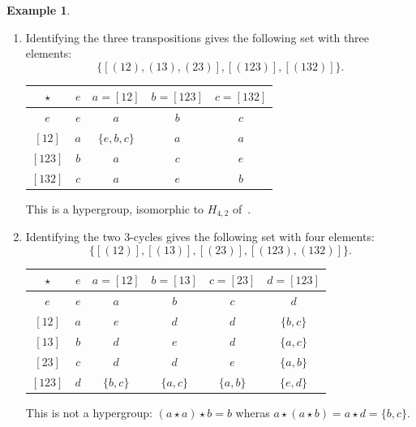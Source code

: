 \documentclass[reqno]{amsart}
\numberwithin{equation}{section}
\theoremstyle{plain}
\theoremstyle{definition}
\newtheorem{example}[equation]{Example}
\begin{document}
\begin{example}
\begin{enumerate}
\item Identifying the three transpositions gives the following set with three elements:
$$\{[(12), (13), (23)], [(123)], [(132)]\}.$$  
\begin{center}
\begin{tabular}{ |c|c|c|c|c| } 
\hline
$\star$ & $e$ & $a=[12]$ & $b=[123]$ & $c=[132]$ \\
\hline
$e$ & $e$ & $a$ & $b$ & $c$ \\ 
\hline
$[12]$ & $a$ & $\{e, b, c\}$ & $a$
& $a$\\ 
\hline
$[123]$ & $b$ & $a$ & $c$
& $e$\\ 
\hline
$[132]$ & $c$ & $a$ & $e$
& $b$\\ 
\hline
\end{tabular}
\end{center}   
This is a hypergroup, isomorphic to $H_{4, 2}$ of~\cite[\S 7.2]{Zieschang}.

\item Identifying the two 3-cycles gives the following set with four elements:
$$\{[(12)], [(13)], [(23)], [(123), (132)]\}.$$  
\begin{center}
\begin{tabular}{ |c|c|c|c|c|c| } 
\hline
$\star$ & $e$ & $a=[12]$ & $b=[13]$ & $c=[23]$ & $d=[123]$ \\
\hline
$e$ & $e$ & $a$ & $b$ & $c$ & $d$ \\ 
\hline
$[12]$ & $a$ & $e$ & $d$
& $d$ & $\{b, c\}$\\ 
\hline
$[13]$ & $b$ & $d$ & $e$
& $d$ & $\{a, c\}$\\ 
\hline
$[23]$ & $c$ & $d$ & $d$
& $e$ & $\{a, b\}$\\ 
\hline
$[123]$ & $d$ & $\{b, c\}$ & $\{a, c\}$
& $\{a, b\}$ & $\{e, d\}$\\ 
\hline
\end{tabular}
\end{center} 
This is not a hypergroup: $(a\star a)\star b=b$ wheras
$a\star (a\star b)=a\star d=\{b, c\}$.


\end{enumerate}
\end{example}
\end{document}
